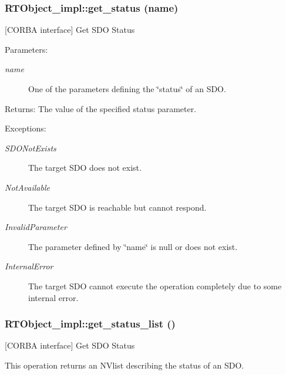 \subsubsection{\setlength{\rightskip}{0pt plus 5cm}RTObject\_\-impl::get\_\-status (name)}\label{classRTObject__impl_RTObject__impla47}


[CORBA interface] Get SDO Status 

\begin{Desc}
\item[Parameters:]
\begin{description}
\item[{\em name}]One of the parameters defining the \char`\"{}status\char`\"{} of an SDO. \end{description}
\end{Desc}
\begin{Desc}
\item[Returns:]The value of the specified status parameter. \end{Desc}
\begin{Desc}
\item[Exceptions:]
\begin{description}
\item[{\em SDONot\-Exists}]The target SDO does not exist. \item[{\em Not\-Available}]The target SDO is reachable but cannot respond. \item[{\em Invalid\-Parameter}]The parameter defined by \char`\"{}name\char`\"{} is null or does not exist. \item[{\em Internal\-Error}]The target SDO cannot execute the operation completely due to some internal error.\end{description}
\end{Desc}
\subsubsection{\setlength{\rightskip}{0pt plus 5cm}RTObject\_\-impl::get\_\-status\_\-list ()}\label{classRTObject__impl_RTObject__impla46}


[CORBA interface] Get SDO Status 

This operation returns an NVlist describing the status of an SDO.

